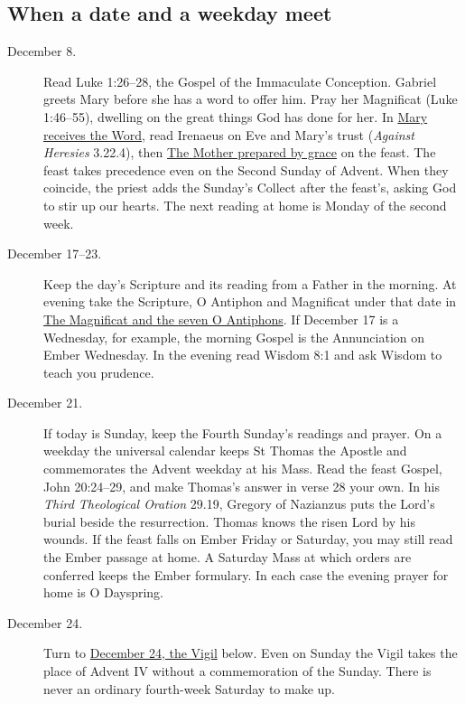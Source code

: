 \subsection{When a date and a weekday meet}

\begin{description}
\item[December 8.] Read Luke 1:26--28, the Gospel of the Immaculate
  Conception. Gabriel greets Mary before she has a word to offer him.
  Pray her Magnificat (Luke 1:46--55), dwelling on the great things
  God has done for her. In \hyperref[sec:advent-mary-word]{Mary receives the Word}, read Irenaeus
  on Eve and Mary's trust (\emph{Against Heresies} 3.22.4), then
  \hyperref[sec:advent-immaculate]{The Mother prepared by grace} on the feast. The feast takes
  precedence even on the Second Sunday of Advent. When they coincide,
  the priest adds the Sunday's Collect after the feast's, asking God to
  stir up our hearts. The next reading at home is Monday of the second week.
\item[December 17--23.] Keep the day's Scripture and its reading from a
  Father in the morning. At evening take the Scripture, O Antiphon
  and Magnificat under that date in \hyperref[sec:advent-evenings]{The Magnificat and the seven O Antiphons}. If
  December 17 is a Wednesday, for
  example, the morning Gospel is the Annunciation on Ember Wednesday.
  In the evening read Wisdom 8:1 and ask Wisdom to teach you prudence.
\item[December 21.] If today is Sunday, keep the Fourth Sunday's
  readings and prayer. On a weekday the universal calendar keeps
  St Thomas the Apostle and commemorates the Advent weekday at his Mass.
  Read the feast Gospel, John 20:24--29, and
  make Thomas's answer in verse 28 your own. In his \emph{Third
  Theological Oration} 29.19, Gregory of Nazianzus puts the Lord's
  burial beside the resurrection. Thomas knows the risen Lord by his
  wounds. If the feast falls on Ember Friday or Saturday, you may
  still read the Ember passage at home. A Saturday Mass at which
  orders are conferred keeps the Ember formulary. In each case the
  evening prayer for home is O Dayspring.
\item[December 24.] Turn to \hyperref[sec:advent-daily-vigil]{December 24, the Vigil} below. Even
  on Sunday the Vigil takes the place of Advent IV without a
  commemoration of the Sunday. There is never an ordinary fourth-week
  Saturday to make up.
\end{description}

